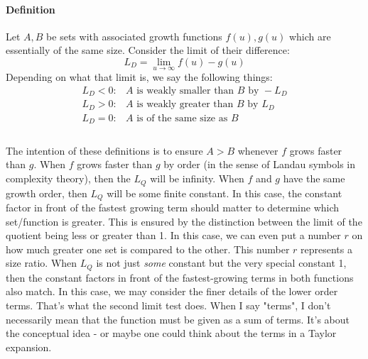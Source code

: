 \documentclass[12pt]{article}
\begin{document}
\paragraph{Definition}
Let $A,B$ be sets with associated growth functions $f(u), g(u)$ which are essentially of the same size. Consider the limit of their difference:
\begin{equation}
	L_D = \lim_{u \rightarrow \infty} f(u) - g(u)
\end{equation}
Depending on what that limit is, we say the following things:
\begin{eqnarray}
  L_D < 0:  &  A \text{ is weakly smaller than } B \text{ by } -L_D \\
  L_D > 0:  &  A \text{ is weakly greater than } B \text{ by }  L_D \\
  L_D = 0:  &  A \text{ is of the same size as } B \\  
\end{eqnarray}

\paragraph{}
The intention of these definitions is to ensure $A > B$ whenever $f$ grows faster than $g$. When $f$ grows faster than $g$ by order (in the sense of Landau symbols in complexity theory), then the $L_Q$ will be infinity. When $f$ and $g$ have the same growth order, then $L_Q$ will be some finite constant. In this case, the constant factor in front of the fastest growing term should matter to determine which set/function is greater. This is ensured by the distinction between the limit of the quotient being less or greater than 1. In this case, we can even put a number $r$ on how much greater one set is compared to the other. This number $r$ represents a size ratio.  When $L_Q$ is not just \emph{some} constant but the very special constant 1, then the constant factors in front of the fastest-growing terms in both functions also match. In this case, we may consider the finer details of the lower order terms. That's what the second limit test does. When I say "terms", I don't necessarily mean that the function must be given as a sum of terms. It's about the conceptual idea - or maybe one could think about the terms in a Taylor expansion. 
\end{document}
